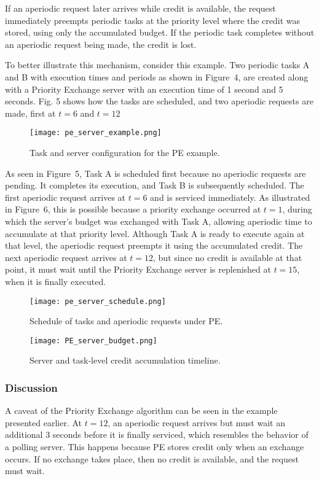 \documentclass[conference]{IEEEtran}
\begin{document}
If an aperiodic request later arrives while credit is available, the request immediately preempts periodic tasks at the priority level where the credit was stored, using only the accumulated budget. If the periodic task completes without an aperiodic request being made, the credit is lost.

To better illustrate this mechanism, consider this example. Two periodic tasks A and B with execution times and periods as shown in Figure~4, are created along with a Priority Exchange server with an execution time of 1 second and 5 seconds. Fig. 5 shows how the tasks are scheduled, and two aperiodic requests are made, first at $t = 6$ and $t = 12$

\begin{figure}[!t]
  \centering
  \texttt{[image: pe\_server\_example.png]}
  \caption{Task and server configuration for the PE example.}
  \label{fig:pe_server_example}
\end{figure}

As seen in Figure~5, Task A is scheduled first because no aperiodic requests are pending. It completes its execution, and Task B is subsequently scheduled. The first aperiodic request arrives at $t = 6$ and is serviced immediately. As illustrated in Figure~6, this is possible because a priority exchange occurred at $t = 1$, during which the server's budget was exchanged with Task A, allowing aperiodic time to accumulate at that priority level. Although Task A is ready to execute again at that level, the aperiodic request preempts it using the accumulated credit. The next aperiodic request arrives at $t = 12$, but since no credit is available at that point, it must wait until the Priority Exchange server is replenished at $t = 15$, when it is finally executed.

\begin{figure*}[!t]
  \centering
  \texttt{[image: pe\_server\_schedule.png]}
  \caption{Schedule of tasks and aperiodic requests under PE.}
  \label{fig:pe_server_schedule}
\end{figure*}

\begin{figure*}[!t]
  \centering
  \texttt{[image: PE\_server\_budget.png]}
  \caption{Server and task‐level credit accumulation timeline.}
  \label{fig:pe_server_budget}
\end{figure*}

\subsubsection*{Discussion}
A caveat of the Priority Exchange algorithm can be seen in the example presented earlier. At $t = 12$, an aperiodic request arrives but must wait an additional 3 seconds before it is finally serviced, which resembles the behavior of a polling server. This happens because PE stores credit only when an exchange occurs. If no exchange takes place, then no credit is available, and the request must wait. 
\end{document}

